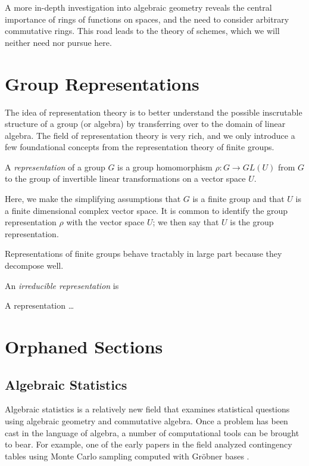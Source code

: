 \documentclass[cclicense]{hmcthesis}
\numberwithin{equation}{chapter}
\numberwithin{thmcounter}{chapter}
\begin{document}
    A more in-depth investigation into algebraic geometry reveals the central
    importance of rings of functions on spaces, and the need to consider
    arbitrary commutative rings.  This road leads to the theory of schemes,
    which we will neither need nor pursue here.

\chapter{Group Representations}
    
    The idea of representation theory is to better understand the possible
    inscrutable structure of a group (or algebra) by transferring over to the
    domain of linear algebra.  The field of representation theory is very rich,
    and we only introduce a few foundational concepts from the representation
    theory of finite groups.

    \begin{definition}
        A \emph{representation} of a group $G$ is a group homomorphism $\rho: G
        \to GL(U)$ from $G$ to the group of invertible linear transformations on
        a vector space $U$.  
    \end{definition}
    Here, we make the simplifying assumptions that $G$ is a finite group and
    that $U$ is a finite dimensional complex vector space.  It is common to
    identify the group representation $\rho$ with the vector space $U$; we then
    say that $U$ is the group representation.

    Representations of finite groups behave tractably in large part because they
    decompose well.
    \begin{definition}
        An \emph{irreducible representation} is
    \end{definition}
    \begin{theorem}[Maschke]
        A representation \ldots
    \end{theorem}
\chapter{Orphaned Sections}

\section{Algebraic Statistics}

    Algebraic statistics is a relatively new field that examines statistical
    questions using algebraic geometry and commutative algebra.  Once a problem
    has been cast in the language of algebra, a number of computational tools
    can be brought to bear.  For example, one of the early papers in the field
    analyzed contingency tables using Monte Carlo sampling computed with Gröbner
    bases \citep{DS98}.
\end{document}

